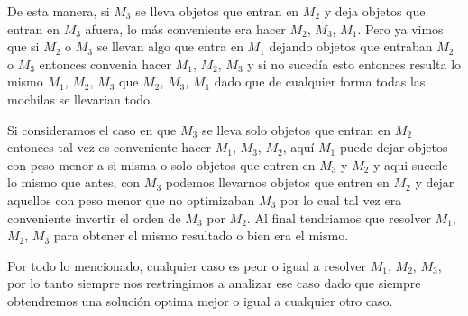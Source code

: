 De esta manera, si $M_3$ se lleva objetos que entran en $M_2$ y deja objetos que entran en $M_3$ afuera, lo más conveniente era hacer $M_2$, $M_3$, $M_1$. Pero ya vimos que si $M_2$ o $M_3$ se llevan algo que entra en $M_1$ dejando objetos que entraban $M_2$ o $M_3$ entonces convenia hacer $M_1$, $M_2$, $M_3$ y si no sucedía esto entonces resulta lo mismo $M_1$, $M_2$, $M_3$ que $M_2$, $M_3$, $M_1$ dado que de cualquier forma todas las mochilas se llevarian todo.

Si consideramos el caso en que $M_3$ se lleva solo objetos que entran en $M_2$ entonces tal vez es conveniente hacer $M_1$, $M_3$, $M_2$, aquí $M_1$ puede dejar objetos con peso menor a si misma o solo objetos que entren en $M_3$ y $M_2$ y aqui sucede lo mismo que antes, con $M_3$ podemos llevarnos objetos que entren en $M_2$ y dejar aquellos con peso menor que no optimizaban $M_3$ por lo cual tal vez era conveniente invertir el orden de $M_3$ por $M_2$.
Al final tendriamos que resolver $M_1$, $M_2$, $M_3$ para obtener el mismo resultado o bien era el mismo. 

Por todo lo mencionado, cualquier caso es peor o igual a resolver $M_1$, $M_2$, $M_3$, por lo tanto siempre nos restringimos a analizar ese caso dado que siempre obtendremos una solución optima mejor o igual a cualquier otro caso.
